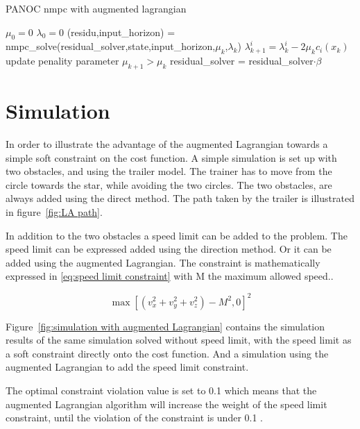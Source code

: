 	\begin{algorithm}
		\caption{PANOC nmpc with augmented lagrangian}
		\label{alg:PANOC with augmented lagrangian}
		\begin{algorithmic}[1]
			\State $\mu_0=0$
			\State $\lambda_0=0$
			\State (residu,input\_horizon) = nmpc\_solve(residual\_solver,state,input\_horizon,$\mu_k$,$\lambda_k$)
			\State $\lambda_{k+1}^{i} = \lambda_{k}^{i} - 2\mu_k c_i(x_k)$
			\State update penality parameter $\mu_{k+1}>\mu_k$
			\State residual\_solver =  residual\_solver$\cdot \beta$
			\EndWhile
			\EndProcedure
		\end{algorithmic}
	\end{algorithm}

\section{Simulation}
In order to illustrate the advantage of the augmented Lagrangian towards a simple soft constraint on the cost function. A simple simulation is set up with two obstacles, and using the trailer model. The trainer has to move from the circle towards the star, while avoiding the two circles. The two obstacles, are always added using the direct method. The path taken by the trailer is illustrated in figure~\ref{fig:LA path}.

In addition to the two obstacles a speed limit can be added to the problem. The speed limit can be expressed added using the direction method. Or it can be added using the augmented Lagrangian. The  constraint is mathematically expressed in \eqref{eq:speed limit constraint} with M the maximum allowed speed..

\begin{equation}
\max[(v_x^2+v_y^2+v_z^2)-M^2,0]^2
\label{eq:speed limit constraint}
\end{equation}

Figure~\ref{fig:simulation with augmented Lagrangian} contains the simulation results of the same simulation solved without speed limit, with the speed limit as a soft constraint directly onto the cost function. And a simulation using the augmented Lagrangian to add the speed limit constraint.

The optimal constraint violation value is set to 0.1 which means that the augmented Lagrangian algorithm will increase the weight of the speed limit constraint, until the violation of the constraint is under 0.1 . 

